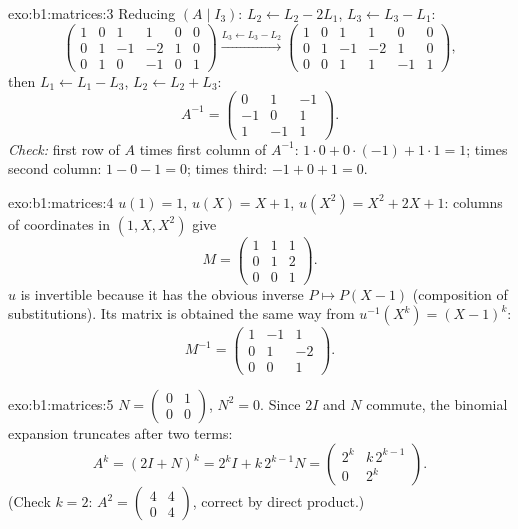 \begin{solution}{exo:b1:matrices:3}
Reducing $(A \mid I_3)$: $L_2 \leftarrow L_2 - 2L_1$, $L_3
\leftarrow L_3 - L_1$:
\[
\begin{pmatrix}
1 & 0 & 1 & 1 & 0 & 0\\
0 & 1 & -1 & -2 & 1 & 0\\
0 & 1 & 0 & -1 & 0 & 1
\end{pmatrix}
\xrightarrow{L_3 \leftarrow L_3 - L_2}
\begin{pmatrix}
1 & 0 & 1 & 1 & 0 & 0\\
0 & 1 & -1 & -2 & 1 & 0\\
0 & 0 & 1 & 1 & -1 & 1
\end{pmatrix},
\]
then $L_1 \leftarrow L_1 - L_3$, $L_2 \leftarrow L_2 + L_3$:
\[
A^{-1} = \begin{pmatrix}
0 & 1 & -1\\
-1 & 0 & 1\\
1 & -1 & 1
\end{pmatrix}.
\]
\emph{Check:} first row of $A$ times first column of $A^{-1}$: $1
\cdot 0 + 0\cdot(-1) + 1\cdot 1 = 1$; times second column: $1 - 0 -
1 = 0$; times third: $-1 + 0 + 1 = 0$.
\end{solution}

\begin{solution}{exo:b1:matrices:4}
$u(1) = 1$, $u(X) = X + 1$, $u(X^2) = X^2 + 2X + 1$: columns of
coordinates in $(1, X, X^2)$ give
\[
M = \begin{pmatrix}
1 & 1 & 1\\
0 & 1 & 2\\
0 & 0 & 1
\end{pmatrix}.
\]
$u$ is invertible because it has the obvious inverse $P \mapsto P(X
- 1)$ (composition of substitutions). Its matrix is obtained the
same way from $u^{-1}(X^k) = (X-1)^k$:
\[
M^{-1} = \begin{pmatrix}
1 & -1 & 1\\
0 & 1 & -2\\
0 & 0 & 1
\end{pmatrix}.
\]
\end{solution}

\begin{solution}{exo:b1:matrices:5}
$N = \begin{pmatrix} 0 & 1\\ 0 & 0\end{pmatrix}$, $N^2 = 0$. Since
$2I$ and $N$ commute, the binomial expansion truncates after two
terms:
\[
A^k = (2I + N)^k = 2^k I + k\,2^{k-1} N
= \begin{pmatrix} 2^k & k\,2^{k-1}\\ 0 & 2^k\end{pmatrix}.
\]
(Check $k = 2$: $A^2 = \begin{pmatrix}4 & 4\\ 0 & 4\end{pmatrix}$,
correct by direct product.)
\end{solution}

